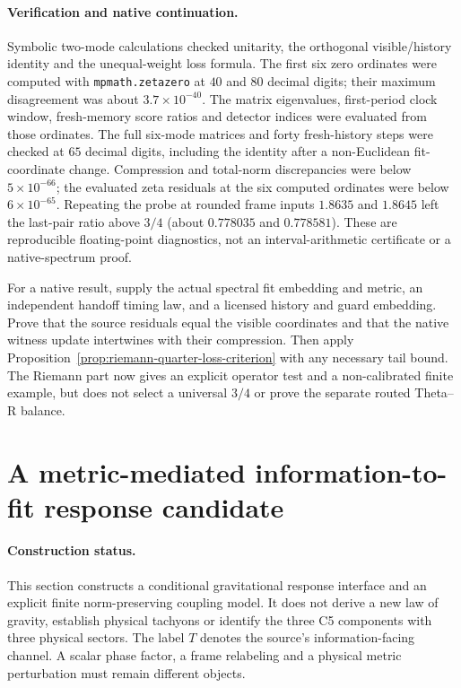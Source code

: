 \documentclass[11pt,a4paper]{article}
\begin{document}
\paragraph{Verification and native continuation.}
Symbolic two-mode calculations checked unitarity, the orthogonal
visible/history identity and the unequal-weight loss formula.
The first six zero ordinates were computed with
\texttt{mpmath.zetazero} at $40$ and $80$ decimal digits; their
maximum disagreement was about $3.7\times10^{-40}$. The matrix
eigenvalues, first-period clock window, fresh-memory score ratios
and detector indices were evaluated from those ordinates.
The full six-mode matrices and forty fresh-history steps were checked
at $65$ decimal digits, including the identity after a non-Euclidean
fit-coordinate change. Compression and total-norm discrepancies were
below $5\times10^{-66}$; the evaluated zeta residuals at the six
computed ordinates were below $6\times10^{-65}$.
Repeating the probe at rounded frame inputs $1.8635$ and $1.8645$
left the last-pair ratio above $3/4$ (about $0.778035$ and
$0.778581$). These are reproducible floating-point diagnostics,
not an interval-arithmetic certificate or a native-spectrum proof.

For a native result, supply the actual spectral fit embedding and
metric, an independent handoff timing law, and a licensed history
and guard embedding. Prove that the source residuals equal the
visible coordinates and that the native witness update intertwines
with their compression. Then apply
Proposition~\ref{prop:riemann-quarter-loss-criterion} with any necessary
tail bound. The Riemann part now gives an explicit operator test and
a non-calibrated finite example, but does not select a universal
$3/4$ or prove the separate routed Theta--R balance.

\section{A metric-mediated information-to-fit response candidate}
\label{sec:metric-mediated-gravity-candidate}

\paragraph{Construction status.}
This section constructs a conditional gravitational response interface
and an explicit finite norm-preserving coupling model. It does not
derive a new law of gravity, establish physical tachyons or identify
the three C5 components with three physical sectors. The label $T$
denotes the source's information-facing channel. A scalar phase factor,
a frame relabeling and a physical metric perturbation must remain
different objects.
\end{document}

